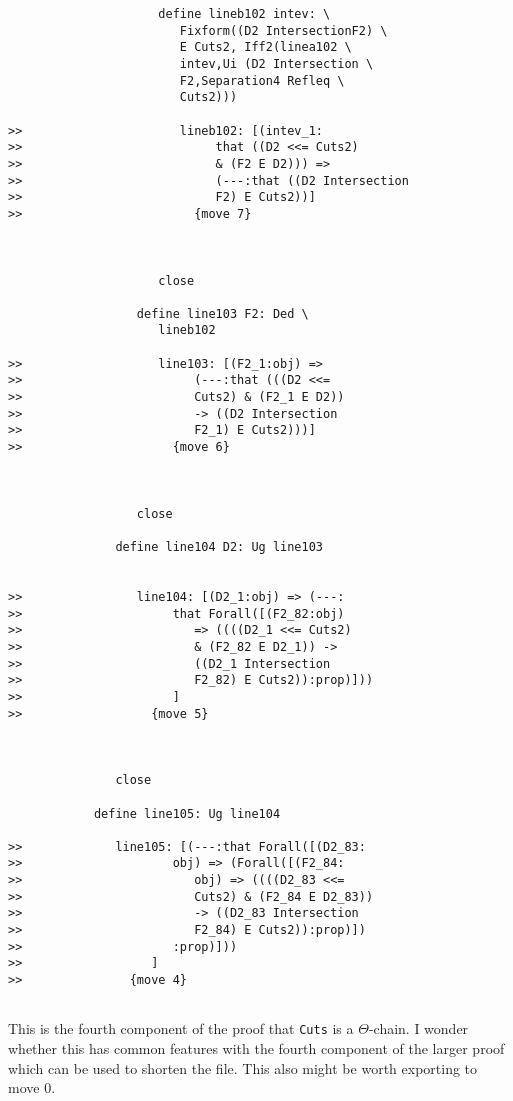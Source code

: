 \documentclass[12pt]{article}
\begin{document}
\begin{verbatim}
                     define lineb102 intev: \
                        Fixform((D2 IntersectionF2) \
                        E Cuts2, Iff2(linea102 \
                        intev,Ui (D2 Intersection \
                        F2,Separation4 Refleq \
                        Cuts2)))

>>                      lineb102: [(intev_1:
>>                           that ((D2 <<= Cuts2)
>>                           & (F2 E D2))) =>
>>                           (---:that ((D2 Intersection
>>                           F2) E Cuts2))]
>>                        {move 7}



                     close

                  define line103 F2: Ded \
                     lineb102

>>                   line103: [(F2_1:obj) =>
>>                        (---:that (((D2 <<=
>>                        Cuts2) & (F2_1 E D2))
>>                        -> ((D2 Intersection
>>                        F2_1) E Cuts2)))]
>>                     {move 6}



                  close

               define line104 D2: Ug line103


>>                line104: [(D2_1:obj) => (---:
>>                     that Forall([(F2_82:obj)
>>                        => ((((D2_1 <<= Cuts2)
>>                        & (F2_82 E D2_1)) ->
>>                        ((D2_1 Intersection
>>                        F2_82) E Cuts2)):prop)]))
>>                     ]
>>                  {move 5}



               close

            define line105: Ug line104

>>             line105: [(---:that Forall([(D2_83:
>>                     obj) => (Forall([(F2_84:
>>                        obj) => ((((D2_83 <<=
>>                        Cuts2) & (F2_84 E D2_83))
>>                        -> ((D2_83 Intersection
>>                        F2_84) E Cuts2)):prop)])
>>                     :prop)]))
>>                  ]
>>               {move 4}


\end{verbatim}

This is the fourth component of the proof that {\tt Cuts} is a $\Theta$-chain.  I wonder whether this has common features with the fourth component of the larger proof
which can be used to shorten the file.  This also might be worth exporting to move 0.
\end{document}
